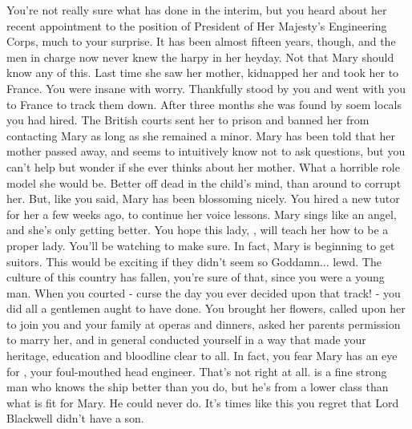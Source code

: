 \documentclass[char]{guildcamp1}
\begin{document}
You're not really sure what \cCurie{} has done in the interim, but you
heard about her recent appointment to the position of President of Her
Majesty's Engineering Corps, much to your surprise. It has been almost
fifteen years, though, and the men in charge now never knew the harpy
in her heyday. Not that Mary should know any of this. Last time she
saw her mother, \cCurie{} kidnapped her and took her to France. You
were insane with worry. Thankfully \cBoddy{} stood by you and went
with you to France to track them down. After three months she was
found by soem locals you had hired. The British courts sent her to
prison and banned her from contacting Mary as long as she remained a
minor. Mary has been told that her mother passed away, and seems to
intuitively know not to ask questions, but you can't help but wonder
if she ever thinks about her mother. What a horrible role model she
would be. Better off dead in the child's mind, than around to corrupt
her. But, like you said, Mary has been blossoming nicely. You hired a
new tutor for her a few weeks ago, to continue her voice lessons. Mary
sings like an angel, and she's only getting better. You hope this
lady, \cWhore{\intro}, will teach her how to be a proper lady. You'll
be watching to make sure. In fact, Mary is beginning to get
suitors. This would be exciting if they didn't seem so
Goddamn... lewd. The culture of this country has fallen, you're sure
of that, since you were a young man. When you courted \cCurie{} -
curse the day you ever decided upon that track! - you did all a
gentlemen aught to have done. You brought her flowers, called upon her
to join you and your family at operas and dinners, asked her parents
permission to marry her, and in general conducted yourself in a way
that made your heritage, education and bloodline clear to all. In
fact, you fear Mary has an eye for \cCid{}, your foul-mouthed head
engineer. That's not right at all. \cCid{} is a fine strong man who
knows the ship better than you do, but he's from a lower class than
what is fit for Mary. He could never do. It's times like this you
regret that Lord Blackwell didn't have a son.
\end{document}
